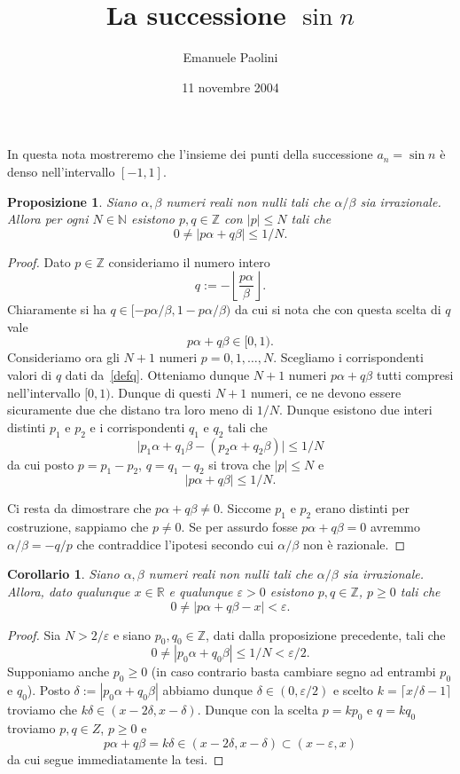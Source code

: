 \documentclass[italian,a4paper]{article}
\title{La successione $\sin n$}
\author{Emanuele Paolini}
\date{11 novembre 2004}
\newcommand{\R}{\mathbb{R}}
\newcommand{\N}{\mathbb{N}}
\newcommand{\Z}{\mathbb{Z}}
\renewcommand{\epsilon}{\varepsilon}
\newtheorem{proposition}[theorem]{Proposizione}
\newtheorem{corollary}[theorem]{Corollario}
\begin{document}
\maketitle
In questa nota mostreremo che l'insieme dei punti della successione $a_n=\sin n$ \`e denso nell'intervallo $[-1,1]$.

\begin{proposition}
Siano $\alpha,\beta$ numeri reali non nulli tali che $\alpha/\beta$
sia irrazionale. Allora per ogni $N\in\N$ esistono $p,q\in\Z$ con
$|p|\le N$ tali che
\[
  0 \neq |p\alpha + q\beta| \le 1/N.
\]  
\end{proposition}
\begin{proof}
Dato $p\in \Z$ consideriamo il numero intero
\begin{equation}\label{defq}
   q := -\left\lfloor\frac{p\alpha}\beta\right\rfloor.
\end{equation}
Chiaramente si ha $q\in[-p\alpha/\beta,1-p\alpha/\beta)$ da cui si
nota che con questa scelta di $q$ vale
\[
p\alpha + q\beta \in [0,1).
\]
Consideriamo ora gli $N+1$ numeri
$p=0,1,\ldots,N$. Scegliamo i corrispondenti valori di $q$ dati
da~\eqref{defq}.
Otteniamo dunque $N+1$ numeri $p\alpha + q\beta$ tutti compresi
nell'intervallo $[0,1)$. 
Dunque di questi $N+1$ numeri, ce ne devono essere sicuramente due che
distano tra loro meno di $1/N$. Dunque esistono due interi distinti
$p_1$ e $p_2$ e i corrispondenti $q_1$ e $q_2$ tali che
\[
  \lvert p_1\alpha+q_1\beta - (p_2\alpha + q_2\beta)\rvert \le 1/N
\]
da cui posto $p=p_1-p_2$, $q=q_1-q_2$ si trova che $|p|\le N$ e 
\[
  \lvert p\alpha + q\beta\rvert \le 1/N.
\]

Ci resta da dimostrare che $p\alpha + q\beta \neq 0$. Siccome $p_1$ e
$p_2$ erano distinti per costruzione, sappiamo che $p\neq 0$. Se per
assurdo fosse $p\alpha+q\beta =0 $ avremmo $\alpha/\beta=-q/p$ che
contraddice l'ipotesi secondo cui $\alpha/\beta$ non \`e razionale.
\end{proof}
\begin{corollary}
Siano $\alpha,\beta$ numeri reali non nulli tali che $\alpha/\beta$
sia irrazionale. Allora, dato qualunque $x\in\R$ e qualunque
$\epsilon>0$ esistono $p,q\in \Z$, $p\ge 0$ tali che 
\[
  0\neq \lvert p\alpha+q\beta - x\rvert < \epsilon.
\]
\end{corollary}
\begin{proof}
Sia $N>2/\epsilon$ e siano $p_0,q_0\in \Z$, 
dati dalla proposizione precedente, tali che
\[
  0\neq |p_0 \alpha + q_0\beta| \le 1/N < \epsilon/2.
\]
Supponiamo anche $p_0\ge 0$ (in caso contrario basta cambiare segno ad
entrambi $p_0$ e $q_0$).
Posto $\delta:= |p_0 \alpha + q_0\beta|$ abbiamo dunque
$\delta\in(0,\epsilon/2)$ e scelto $k=\lceil x/\delta -1\rceil$ troviamo
che $k\delta\in(x-2\delta,x-\delta)$. Dunque con la scelta $p=kp_0$ e
$q=kq_0$ troviamo $p,q\in Z$, $p\ge 0$ e 
\[
  p\alpha + q\beta = k\delta \in (x-2\delta,x-\delta)\subset (x-\epsilon,x)
\]
da cui segue immediatamente la tesi.
\end{proof}
\end{document}
